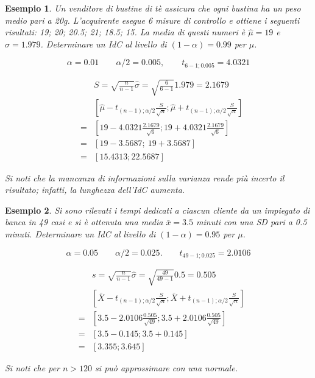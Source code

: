 \documentclass[
  11pt,
]{book}
\theoremstyle{mytheoremstyle}
\theoremstyle{mydefstyle}
\newtheorem{example}{{Esempio}}[section]
\begin{document}
\begin{example}
Un venditore di bustine di tè assicura che ogni bustina ha un
peso medio pari a 20g.
L'acquirente esegue 6 misure di controllo e ottiene i seguenti
risultati: 19; 20; 20.5; 21; 18.5; 15.
La media di questi numeri è \(\hat\mu = 19\) e \(\widehat{\sigma}=1.979\).
Determinare un IdC al livello di \((1-\alpha)=0.99\) per \(\mu\).

\[\alpha=0.01\qquad \alpha/2=0.005,\qquad t_{6-1;0.005}=4.0321\]

\begin{eqnarray*}
& & S = \sqrt{\frac{n} {n-1}} \widehat{\sigma}
      =  \sqrt{\frac{6} {6-1}} 1.979 = 2.1679                        \\
& & \left[\hat\mu -t_{(n-1); \alpha/2} \frac{S} {\sqrt{n}};
          \hat\mu +t_{(n-1); \alpha/2} \frac{S} {\sqrt{n}} \right] \\
&=& \left[ 19 -4.0321 \frac{2.1679} {\sqrt{6}};  19 +4.0321 \frac{2.1679} {\sqrt{6}} \right]               \\
&=& \left[ 19 - 3.5687;~ 19 + 3.5687 \right]                          \\
&=& \left[ 15.4313; 22.5687 \right]
\end{eqnarray*}

Si noti che la mancanza di informazioni sulla varianza rende più
incerto il risultato; infatti, la lunghezza dell'IdC aumenta.
\end{example}

\begin{example}
Si sono rilevati i tempi dedicati a ciascun cliente da un impiegato
di banca in 49 casi e si è ottenuta una media \(\bar{x}=3.5\) minuti
con una SD pari a 0.5 minuti.
Determinare un IdC al livello di \((1-\alpha)=0.95\) per \(\mu\).

\[\alpha=0.05\qquad \alpha/2=0.025.\qquad t_{49-1;0.025}=2.0106\]

\begin{eqnarray*}
& & s = \sqrt{\frac{n} {n-1}} \widehat{\sigma}
      =  \sqrt{\frac{49} {49-1}} 0.5 = 0.505                         \\
& & \left[\bar{X} -t_{(n-1);  \alpha/2} \frac{S} {\sqrt{n}};
          \bar{X} +t_{(n-1);  \alpha/2} \frac{S} {\sqrt{n}} \right] \\
&=& \left[ 3.5 -2.0106 \frac{0.505} {\sqrt{49}};
           3.5 +2.0106 \frac{0.505} {\sqrt{49}} \right]              \\
&=& \left[ 3.5 - 0.145; 3.5 + 0.145 \right]                          \\
&=& \left[ 3.355; 3.645 \right]
\end{eqnarray*}

Si noti che per \(n>120\) si può approssimare con una normale.
\end{example}
\end{document}
